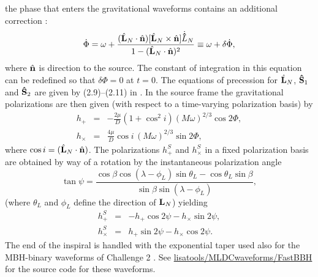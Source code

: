 \documentclass{iopart}
\def\bL{{\hat{\bf L}_{N}}}
\def\hn{{\hat{\bf n}}}
\begin{document}
the phase that enters the gravitational waveforms contains an additional correction \cite{ACST}:
%
\begin{equation}
\dot{\Phi} = \omega + \frac{(\bL\cdot\hn)[\bL\times \hn]\dot{\bf \hat{L}}_N}{1-(\bL\cdot\hn)^2}
\equiv \omega + \delta\dot{\Phi},\label{totPhi}
\end{equation}
%
where $\hn$ is direction to the source.
The constant of integration in this equation can be redefined so that $\delta\Phi = 0$ at $t=0$.  The equations of precession for $\bL$, ${\bf \hat{S}}_1$ and ${\bf \hat{S}}_2$ are given by (2.9)--(2.11) in 
 \cite{LangHughes}. In the source frame the gravitational polarizations are then given (with respect to a time-varying polarization basis) by
%
\begin{eqnarray}
h_{+} &=& -\frac{2\mu}{D}(1 + \cos^2 i)(M\omega)^{2/3}\cos{2\Phi}, \nonumber \\
h_{\times} &=& \frac{4\mu}{D}\cos i \,(M\omega)^{2/3}\sin{2\Phi},
\label{eq:polmbh}
\end{eqnarray}
%
where $\cos{i} = (\bL \cdot \hn)$.
The polarizations $h^S_+$ and $h^S_\times$ in a fixed polarization basis are obtained by way of a rotation by the instantaneous polarization angle
%
\begin{equation}
\tan{\psi} = \frac{\cos{\beta}\cos{(\lambda -\phi_L)}\sin{\theta_L} - \cos{\theta_L}\sin{\beta}}
{\sin{\beta}\sin{(\lambda - \phi_L)}},
\end{equation}
%
(where $\theta_L$ and $\phi_L$ define the direction of ${\bf L}_N$) yielding
%
\begin{eqnarray}
h_{+}^S &=& -h_{+}\cos{2\psi} - h_{\times}\sin{2\psi},\\
h_{\times}^S &=& h_{+}\sin{2\psi} - h_{\times}\cos{2\psi}.
\end{eqnarray}
%
The end of the inspiral is handled with the exponential taper used also for the MBH-binary waveforms of Challenge 2 \cite{mldcgwdaw2}.
See \url{lisatools/MLDCwaveforms/FastBBH} for the source code for these waveforms.
\end{document}
